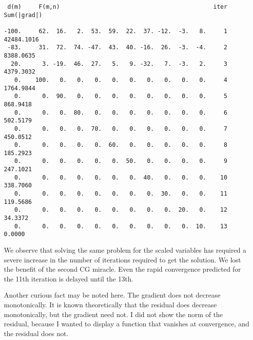 \par\noindent
\footnotesize
\begin{verbatim}
 d(m)     F(m,n)                                            iter   Sum(|grad|)

-100.     62.  16.   2.  53.  59.  22.  37. -12.  -3.   8.     1  42484.1016
 -83.     31.  72.  74. -47.  43.  40. -16.  26.  -3.  -4.     2   8388.0635
  20.      3. -19.  46.  27.   5.   9. -32.   7.  -3.   2.     3   4379.3032
   0.    100.   0.   0.   0.   0.   0.   0.   0.   0.   0.     4   1764.9844
   0.      0.  90.   0.   0.   0.   0.   0.   0.   0.   0.     5    868.9418
   0.      0.   0.  80.   0.   0.   0.   0.   0.   0.   0.     6    502.5179
   0.      0.   0.   0.  70.   0.   0.   0.   0.   0.   0.     7    450.0512
   0.      0.   0.   0.   0.  60.   0.   0.   0.   0.   0.     8    185.2923
   0.      0.   0.   0.   0.   0.  50.   0.   0.   0.   0.     9    247.1021
   0.      0.   0.   0.   0.   0.   0.  40.   0.   0.   0.    10    338.7060
   0.      0.   0.   0.   0.   0.   0.   0.  30.   0.   0.    11    119.5686
   0.      0.   0.   0.   0.   0.   0.   0.   0.  20.   0.    12     34.3372
   0.      0.   0.   0.   0.   0.   0.   0.   0.   0.  10.    13      0.0000
\end{verbatim}
\normalsize
We observe that solving the same problem for the scaled variables
has required a severe increase
in the number of iterations required to get the solution.
We lost the benefit of the second CG miracle.
Even the rapid convergence predicted for the 11th iteration
is delayed until the 13th.
\par
Another curious fact may be noted here.
The gradient does not decrease monotonically.
It is known theoretically that the residual does decrease monotonically,
but the gradient need not.
I did not show the norm of the residual,
because I wanted to display a function that vanishes at convergence,
and the residual does not.

